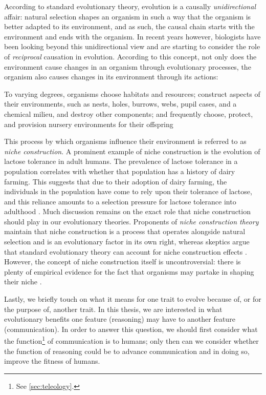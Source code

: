 According to standard evolutionary theory, evolution is a causally \emph{unidirectional} affair: natural selection shapes an organism in such a way that the organism is better adapted to its environment, and as such, the causal chain starts with the environment and ends with the organism.
In recent years however, biologists have been looking beyond this unidirectional view and are starting to consider the role of \emph{reciprocal} causation in evolution. According to this concept, not only does the environment cause changes in an organism through evolutionary processes, the organism also causes changes in its environment through its actions:
\begin{quoting}
    To varying degrees, organisms choose habitats and resources; construct aspects of their environments, such as nests, holes, burrows, webs, pupil cases, and a chemical milieu, and destroy other components; and frequently choose, protect, and provision nursery environments for their offspring
\hfill \citep[p.~81]{Day03}
\end{quoting}
This process by which organisms influence their environment is referred to as \emph{niche construction}.
A prominent example of niche construction is the evolution of lactose tolerance in adult humans. The prevalence of lactose tolerance in a population correlates with whether that population has a history of dairy farming. This suggests that due to their adoption of dairy farming, the individuals in the population have come to rely upon their tolerance of lactose, and this reliance amounts to a selection pressure for lactose tolerance into adulthood \citep{S-P13}.
Much discussion remains on the exact role that niche construction should play in our evolutionary theories. Proponents of \emph{niche construction theory} maintain that niche construction is a process that operates alongside natural selection and is an evolutionary factor in its own right, whereas skeptics argue that standard evolutionary theory can account for niche construction effects \citep{S-P13}. However, the concept of niche construction itself is uncontroversial: there is plenty of empirical evidence for the fact that organisms may partake in shaping their niche \citep{S-P13}.

Lastly, we briefly touch on what it means for one trait to evolve because of, or for the purpose of, another trait. In this thesis, we are interested in what evolutionary benefits one feature (reasoning) may have to another feature (communication). In order to answer this question, we should first consider what the function\footnote{See \cref{sec:teleology}.} of communication is to humans; only then can we consider whether the function of reasoning could be to advance communication and in doing so, improve the fitness of humans.

